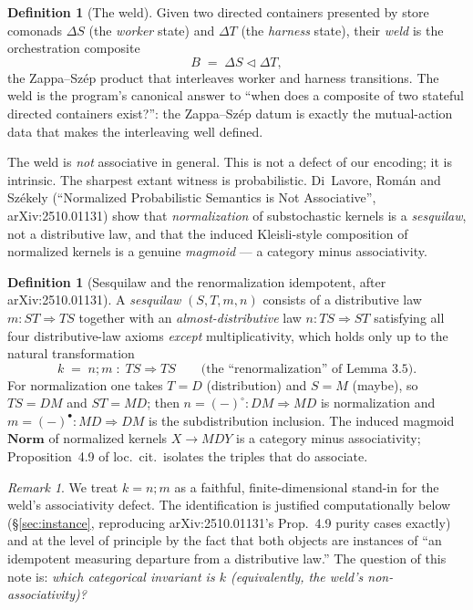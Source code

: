 \documentclass[11pt]{amsart}
\theoremstyle{plain}
\theoremstyle{definition}
\newtheorem{definition}[theorem]{Definition}
\theoremstyle{remark}
\newtheorem{remark}[theorem]{Remark}
\newcommand{\Norm}{\mathbf{Norm}}
\renewcommand{\lhd}{\triangleleft}
\newcommand{\Store}[1]{\Delta #1}
\newcommand{\comp}{\mathbin{;}}
\begin{document}
\begin{definition}[The weld]
Given two directed containers presented by store comonads $\Store{S}$ (the \emph{worker} state) and
$\Store{T}$ (the \emph{harness} state), their \emph{weld} is the orchestration composite
\[
  B \;=\; \Store{S}\lhd\Store{T},
\]
the Zappa--Sz\'ep product that interleaves worker and harness transitions. The weld is the program's
canonical answer to ``when does a composite of two stateful directed containers exist?'': the
Zappa--Sz\'ep datum is exactly the mutual-action data that makes the interleaving well defined.
\end{definition}

The weld is \emph{not} associative in general. This is not a defect of our encoding; it is
intrinsic. The sharpest extant witness is probabilistic. Di~Lavore, Rom\'an and Sz\'ekely
(``Normalized Probabilistic Semantics is Not Associative'', arXiv:2510.01131) show that
\emph{normalization} of substochastic kernels is a \emph{sesquilaw}, not a distributive law, and that
the induced Kleisli-style composition of normalized kernels is a genuine \emph{magmoid} --- a
category minus associativity.

\begin{definition}[Sesquilaw and the renormalization idempotent, after arXiv:2510.01131]
\label{def:sesquilaw}
A \emph{sesquilaw} $(S,T,m,n)$ consists of a distributive law $m\colon ST\Rightarrow TS$ together
with an \emph{almost-distributive} law $n\colon TS\Rightarrow ST$ satisfying all four
distributive-law axioms \emph{except} multiplicativity, which holds only up to the natural
transformation
\[
  k \;=\; n\comp m \;\colon\; TS \Rightarrow TS
  \qquad\text{(the ``renormalization'' of Lemma 3.5).}
\]
For normalization one takes $T=D$ (distribution) and $S=M$ (maybe), so $TS=DM$ and $ST=MD$; then
$n=(-)^{\circ}\colon DM\Rightarrow MD$ is normalization and $m=(-)^{\bullet}\colon MD\Rightarrow DM$
is the subdistribution inclusion. The induced magmoid $\Norm$ of normalized kernels $X\to MDY$ is a
category minus associativity; Proposition~4.9 of loc.\ cit.\ isolates the triples that do associate.
\end{definition}

\begin{remark}
We treat $k=n\comp m$ as a faithful, finite-dimensional stand-in for the weld's associativity defect.
The identification is justified computationally below (\S\ref{sec:instance}, reproducing
arXiv:2510.01131's Prop.~4.9 purity cases exactly) and at the level of principle by the fact that
both objects are instances of ``an idempotent measuring departure from a distributive law.'' The
question of this note is: \emph{which categorical invariant is $k$ (equivalently, the weld's
non-associativity)?}
\end{remark}
\end{document}
